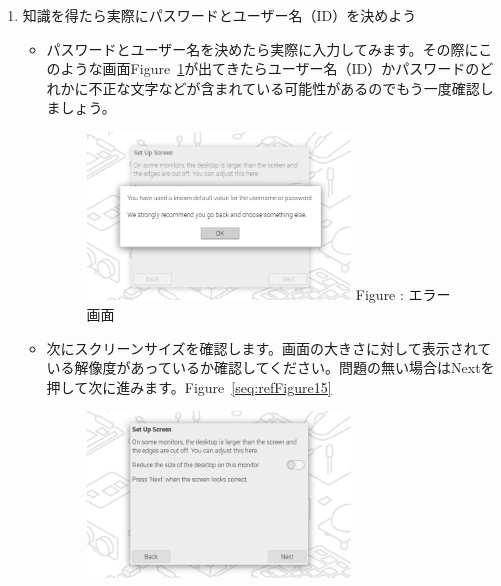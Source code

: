 \documentclass[a4paper,12pt]{jarticle}
\begin{document}
\begin{enumerate}
    \item             
                知識を得たら実際にパスワードとユーザー名（ID）を決めよう
                \begin{itemize}
                  \item
                      パスワードとユーザー名を決めたら実際に入力してみます。その際にこのような画面Figure~\ref{seq:refFigure14}が出てきたらユーザー名（ID）かパスワードのどれかに不正な文字などが含まれている可能性があるのでもう一度確認しましょう。
                      \begin{figure}[h]
                        \centering
                        \begin{minipage}{5.228cm}
                          {\upshape
                            \includegraphics[width=7.000cm]{sw_image04.png}
                            \newline
                            Figure {\theFigure\label{seq:refFigure14}}:
                            エラー画面}
                        \end{minipage}
                      \end{figure}
                \end{itemize}
                \begin{itemize}
                  \item
                        次にスクリーンサイズを確認します。画面の大きさに対して表示されている解像度があっているか確認してください。問題の無い場合はNextを押して次に進みます。Figure~\ref{seq:refFigure15}
                        \begin{figure}[h]
                          \centering
                          \begin{minipage}{5.228cm}
                            {\upshape
                              \includegraphics[width=7.000cm]{sw_image05.png}
}
\end{minipage}
\end{figure}
\end{itemize}
\end{enumerate}
\end{document}
